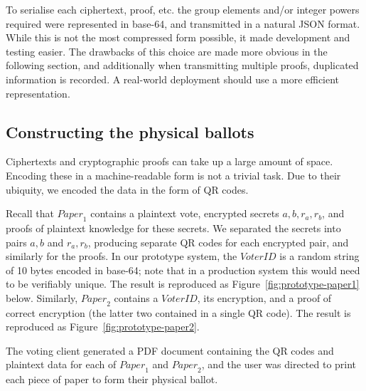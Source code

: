 \documentclass[12pt,a4paper]{article}
\theoremstyle{definition}
\newcommand{\VoterID}{\mathit{VoterID}}
\newcommand{\Paper}{\mathit{Paper}}
\begin{document}
To serialise each ciphertext, proof, etc. the group elements and/or integer powers required were represented in base-64, and transmitted in a natural JSON format. While this is not the most compressed form possible, it made development and testing easier. The drawbacks of this choice are made more obvious in the following section, and additionally when transmitting multiple proofs, duplicated information is recorded. A real-world deployment should use a more efficient representation.

\subsection{Constructing the physical ballots}
Ciphertexts and cryptographic proofs can take up a large amount of space. Encoding these in a machine-readable form is not a trivial task. Due to their ubiquity, we encoded the data in the form of QR codes.

Recall that $\Paper_1$ contains a plaintext vote, encrypted secrets $a, b, r_a, r_b$, and proofs of plaintext knowledge for these secrets. We separated the secrets into pairs $a, b$ and $r_a, r_b$, producing separate QR codes for each encrypted pair, and similarly for the proofs. In our prototype system, the $\VoterID$ is a random string of 10 bytes encoded in base-64; note that in a production system this would need to be verifiably unique. The result is reproduced as Figure~\ref{fig:prototype-paper1} below. Similarly, $\Paper_2$ contains a $\VoterID$, its encryption, and a proof of correct encryption (the latter two contained in a single QR code). The result is reproduced as Figure~\ref{fig:prototype-paper2}.

The voting client generated a PDF document containing the QR codes and plaintext data for each of $\Paper_1$ and $\Paper_2$, and the user was directed to print each piece of paper to form their physical ballot.
\end{document}
